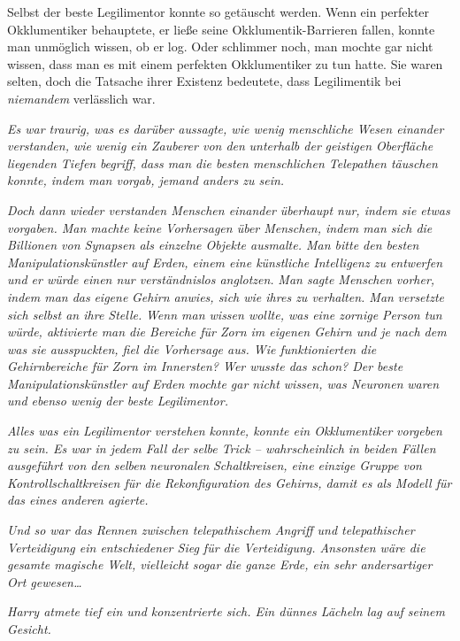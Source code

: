 {Selbst der beste Legilimentor konnte so getäuscht werden. Wenn ein perfekter Okklumentiker behauptete, er ließe seine Okklumentik-Barrieren fallen, konnte man unmöglich wissen, ob er log. Oder schlimmer noch, man mochte gar nicht wissen, dass man es mit einem perfekten Okklumentiker zu tun hatte. Sie waren selten, doch die Tatsache ihrer Existenz bedeutete, dass Legilimentik bei \emph{niemandem} verlässlich war.

\emph{Es war traurig, was es darüber aussagte, wie wenig menschliche Wesen einander verstanden, wie wenig ein Zauberer von den} \emph{unterhalb der} \emph{geistigen Oberfläche} \emph{liegenden Tiefen} \emph{begriff, dass man die besten menschlichen Telepathen täuschen konnte, indem man vorgab, jemand anders zu sein.}

\emph{Doch dann wieder verstanden Menschen einander überhaupt nur, indem sie etwas vorgaben. Man machte keine Vorhersagen über Menschen, indem man sich die Billionen von Synapsen als einzelne Objekte ausmalte. Man bitte den besten Manipulationskünstler auf Erden, einem eine künstliche Intelligenz zu entwerfen und er würde einen nur verständnislos anglotzen.} \emph{Man sagte Menschen vorher, indem man das} \emph{\emph{eigene}} \emph{Gehirn anwies, sich wie ihres zu verhalten. Man} \emph{\emph{versetzte sich selbst an ihre Stelle.}} \emph{Wenn man wissen wollte, was eine zornige Person tun würde, aktivierte man die Bereiche für Zorn im eigenen Gehirn und je nach dem was sie ausspuckten, fiel die Vorhersage aus. Wie funktionierten die Gehirnbereiche für Zorn im Innersten? Wer wusste das schon? Der beste Manipulationskünstler auf Erden mochte gar nicht wissen, was Neuronen} \emph{\emph{waren}} \emph{und ebenso wenig der beste Legilimentor.}

\emph{Alles was ein Legilimentor} \emph{\emph{verstehen}} \emph{konnte, konnte ein Okklumentiker} \emph{\emph{vorgeben}} \emph{zu sein. Es war in jedem Fall der selbe Trick -- wahrscheinlich in beiden Fällen ausgeführt von den selben} \emph{neuronalen} \emph{Schaltkreisen, eine einzige Gruppe von Kontrollschaltkreisen für die Rekonfiguration des Gehirns, damit es als Modell für das eines anderen agierte.}

\emph{Und so war das Rennen zwischen telepathischem Angriff und telepathischer Verteidigung ein entschiedener Sieg für die Verteidigung. Ansonsten wäre die gesamte magische Welt, vielleicht sogar die ganze Erde, ein sehr andersartiger Ort gewesen…}

\emph{Harry atmete tief ein und konzentrierte sich. Ein dünnes Lächeln lag auf seinem Gesicht.}

}
